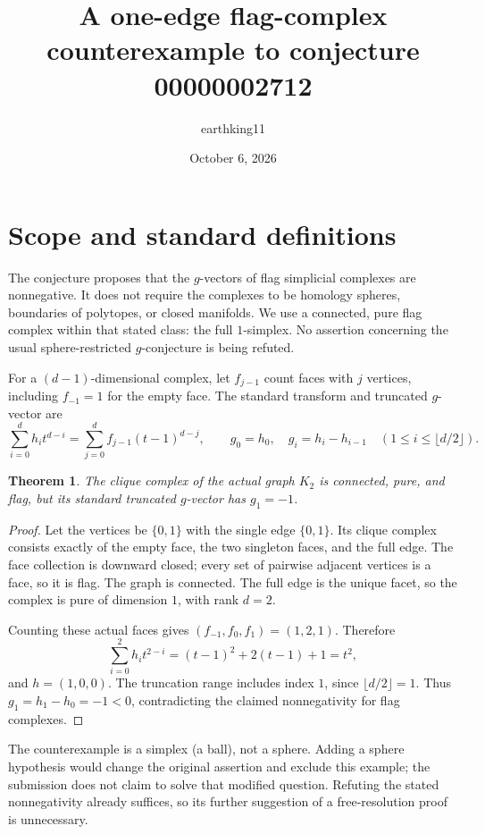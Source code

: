 \documentclass[10pt]{article}
\title{A one-edge flag-complex counterexample to conjecture 00000002712}
\author{earthking11}
\date{October 6, 2026}
\newtheorem{theorem}{Theorem}
\begin{document}
\maketitle
\section*{Scope and standard definitions}
The conjecture proposes that the $g$-vectors of flag simplicial complexes
are nonnegative. It does not require the complexes to be homology
spheres, boundaries of polytopes, or closed manifolds. We use a connected,
pure flag complex within that stated class: the full $1$-simplex.
No assertion concerning the usual sphere-restricted $g$-conjecture is
being refuted.

For a $(d-1)$-dimensional complex, let $f_{j-1}$ count faces with $j$
vertices, including $f_{-1}=1$ for the empty face. The standard transform
and truncated $g$-vector are
\[
 \sum_{i=0}^{d}h_i t^{d-i}
 =\sum_{j=0}^{d}f_{j-1}(t-1)^{d-j},\qquad
 g_0=h_0,\quad g_i=h_i-h_{i-1}\quad(1\leq i\leq\lfloor d/2\rfloor).
\]

\begin{theorem}
The clique complex of the actual graph $K_2$ is connected, pure, and
flag, but its standard truncated $g$-vector has $g_1=-1$.
\end{theorem}
\begin{proof}
Let the vertices be $\{0,1\}$ with the single edge $\{0,1\}$. Its clique
complex consists exactly of the empty face, the two singleton faces,
and the full edge. The face collection is downward closed; every set of
pairwise adjacent vertices is a face, so it is flag. The graph is
connected. The full edge is the unique facet, so the complex is pure of
dimension $1$, with rank $d=2$.

Counting these actual faces gives $(f_{-1},f_0,f_1)=(1,2,1)$.
Therefore
\[
 \sum_{i=0}^{2}h_i t^{2-i}
 =(t-1)^2+2(t-1)+1=t^2,
\]
and $h=(1,0,0)$. The truncation range includes index $1$, since
$\lfloor d/2\rfloor=1$. Thus $g_1=h_1-h_0=-1<0$, contradicting the
claimed nonnegativity for flag complexes.
\end{proof}

The counterexample is a simplex (a ball), not a sphere. Adding a sphere
hypothesis would change the original assertion and exclude this example;
the submission does not claim to solve that modified question.
Refuting the stated nonnegativity already suffices, so its further
suggestion of a free-resolution proof is unnecessary.
\end{document}
